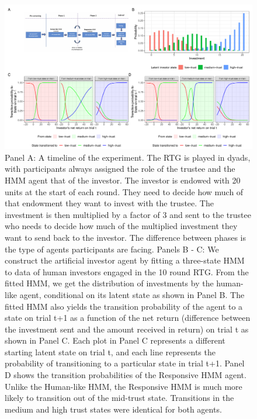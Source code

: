 \documentclass[
]{article}
\begin{document}
\begin{landscape}
\begin{figure}[htbp]
\centering
\includegraphics[width=\linewidth]{plots/figure1.pdf}
\caption{\small{Panel A: A timeline of the experiment. The RTG is played in dyads, with participants always assigned the role of the trustee and the HMM agent that of the investor. The investor is endowed with 20 units at the start of each round. They need to decide how much of that endowment they want to invest with the trustee. The investment is then multiplied by a factor of 3 and sent to the trustee who needs to decide how much of the multiplied investment they want to send back to the investor. The difference between phases is the type of agents participants are facing. Panels B - C: We construct the artificial investor agent by fitting a three-state HMM to data of human investors engaged in the 10 round RTG. From the fitted HMM, we get the distribution of investments by the human-like agent, conditional on its latent state as shown in Panel B. The fitted HMM also yields the transition probability of the agent to a state on trial t+1 as a function of the net return (difference between the investment sent and the amount received in return) on trial t as shown in Panel C. Each plot in Panel C represents a different starting latent state on trial t, and each line represents the probability of transitioning to a particular state in trial t+1. Panel D shows the transition probabilities of the Responsive HMM agent. Unlike the Human-like HMM, the Responsive HMM is much more likely to transition out of the mid-trust state. Transitions in the medium and high trust states were identical for both agents.}}
\label{fig:combinedPlots}
\end{figure}
\end{landscape}
\end{document}
